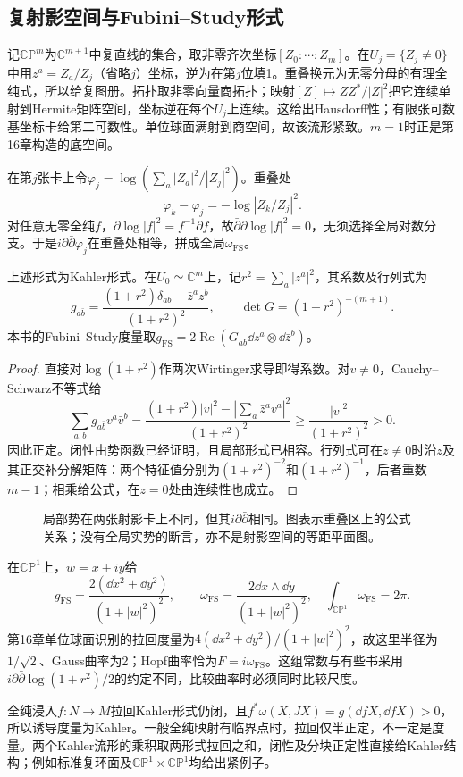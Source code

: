 \subsection{复射影空间与Fubini--Study形式}
记$\mathbb{CP}^m$为$\mathbb C^{m+1}$中复直线的集合，取非零齐次坐标$[Z_0:\cdots:Z_m]$。在$U_j=\{Z_j\ne0\}$中用$z^a=Z_a/Z_j$（省略$j$）坐标，逆为在第$j$位填1。重叠换元为无零分母的有理全纯式，所以给复图册。拓扑取非零向量商拓扑；映射$[Z]\mapsto ZZ^*/|Z|^2$把它连续单射到Hermite矩阵空间，坐标逆在每个$U_j$上连续。这给出Hausdorff性；有限张可数基坐标卡给第二可数性。单位球面满射到商空间，故该流形紧致。$m=1$时正是第16章构造的底空间。

在第$j$张卡上令$\varphi_j=\log(\sum_a|Z_a|^2/|Z_j|^2)$。重叠处
\[
 \varphi_k-\varphi_j=-\log|Z_k/Z_j|^2.
\]
对任意无零全纯$f$，$\partial\log|f|^2=f^{-1}\partial f$，故$\bar\partial\partial\log|f|^2=0$，无须选择全局对数分支。于是$i\partial\bar\partial\varphi_j$在重叠处相等，拼成全局$\omega_{\mathrm{FS}}$。

\begin{theorem}\label{thm:fubini-study}
上述形式为Kahler形式。在$U_0\simeq\mathbb C^m$上，记$r^2=\sum_a|z^a|^2$，其系数及行列式为
\begin{equation}\label{eq:fs-matrix}
 g_{a\bar b}=\frac{(1+r^2)\delta_{ab}-\bar z^a z^b}{(1+r^2)^2},
 \qquad\det G=(1+r^2)^{-(m+1)}.
\end{equation}
本书的Fubini--Study度量取$g_{\mathrm{FS}}=2\operatorname{Re}(G_{a\bar b}\dd z^a\otimes\dd\bar z^b)$。
\end{theorem}
\begin{proof}
直接对$\log(1+r^2)$作两次Wirtinger求导即得系数。对$v\ne0$，Cauchy--Schwarz不等式给
\[
 \sum_{a,b}g_{a\bar b}v^a\bar v^b
 =\frac{(1+r^2)|v|^2-|\sum_a\bar z^a v^a|^2}{(1+r^2)^2}
 \geq\frac{|v|^2}{(1+r^2)^2}>0.
\]
因此正定。闭性由势函数已经证明，且局部形式已相容。行列式可在$z\ne0$时沿$\bar z$及其正交补分解矩阵：两个特征值分别为$(1+r^2)^{-2}$和$(1+r^2)^{-1}$，后者重数$m-1$；相乘给公式，在$z=0$处由连续性也成立。
\end{proof}

\begin{figure}[htbp]
\centering
\caption{局部势在两张射影卡上不同，但其$i\partial\bar\partial$相同。图表示重叠区上的公式关系；没有全局实势的断言，亦不是射影空间的等距平面图。}
\label{fig:projective-potentials}
\end{figure}

在$\mathbb{CP}^1$上，$w=x+iy$给
\[
 g_{\mathrm{FS}}=\frac{2(\dd x^2+\dd y^2)}{(1+|w|^2)^2},\qquad
 \omega_{\mathrm{FS}}=\frac{2\dd x\wedge\dd y}{(1+|w|^2)^2},
 \quad\int_{\mathbb{CP}^1}\omega_{\mathrm{FS}}=2\pi.
\]
第16章单位球面识别的拉回度量为$4(\dd x^2+\dd y^2)/(1+|w|^2)^2$，故这里半径为$1/\sqrt2$、Gauss曲率为2；Hopf曲率恰为$F=i\omega_{\mathrm{FS}}$。这组常数与有些书采用$i\partial\bar\partial\log(1+r^2)/2$的约定不同，比较曲率时必须同时比较尺度。

全纯浸入$f:N\to M$拉回Kahler形式仍闭，且$f^*\omega(X,JX)=g(\dd fX,\dd fX)>0$，所以诱导度量为Kahler。一般全纯映射有临界点时，拉回仅半正定，不一定是度量。两个Kahler流形的乘积取两形式拉回之和，闭性及分块正定性直接给Kahler结构；例如标准复环面及$\mathbb{CP}^1\times\mathbb{CP}^1$均给出紧例子。
